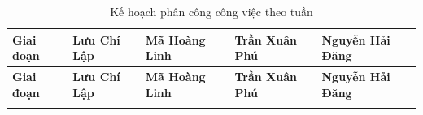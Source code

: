 {\scriptsize
\setlength{\tabcolsep}{3pt}
\renewcommand{\arraystretch}{1.5}
\begin{longtable}{|>{\raggedright\arraybackslash}p{}|>{\raggedright\arraybackslash}p{}|>{\raggedright\arraybackslash}p{}|>{\raggedright\arraybackslash}p{}|>{\raggedright\arraybackslash}p{}|}
\caption{Kế hoạch phân công công việc theo tuần}\\
\hline
\textbf{Giai đoạn} & \textbf{Lưu Chí Lập} & \textbf{Mã Hoàng Linh} & \textbf{Trần Xuân Phú} & \textbf{Nguyễn Hải Đăng} \\
\hline
\endfirsthead

\hline
\textbf{Giai đoạn} & \textbf{Lưu Chí Lập} & \textbf{Mã Hoàng Linh} & \textbf{Trần Xuân Phú} & \textbf{Nguyễn Hải Đăng} \\
\hline
\endhead

\hline
\endfoot


\end{longtable}}
